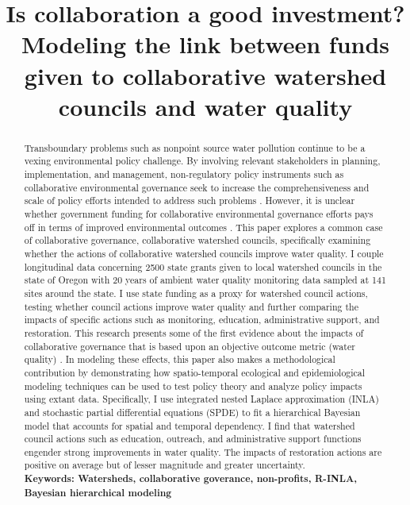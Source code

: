 \documentclass[12pt,a4paper,titlepage]{article}
\title{Is collaboration a good investment? Modeling the link between funds given to collaborative watershed councils and water quality}
\begin{document}
\maketitle

\begin{abstract}


Transboundary problems such as nonpoint source water pollution continue to be a vexing environmental policy challenge. By involving relevant stakeholders in planning, implementation, and management, non-regulatory policy instruments such as collaborative environmental governance seek to increase the comprehensiveness and scale of policy efforts intended to address such problems \parencite{margerum2011}. However, it is unclear whether government funding for collaborative environmental governance efforts pays off in terms of improved environmental outcomes \parencite{thomas2012}. This paper explores a common case of collaborative governance, collaborative watershed councils, specifically examining whether the actions of collaborative watershed councils improve water quality. I couple longitudinal data concerning 2500 state grants given to local watershed councils in the state of Oregon with 20 years of ambient water quality monitoring data sampled at 141 sites around the state. I use state funding as a proxy for watershed council actions, testing whether council actions improve water quality and further comparing the impacts of specific actions such as monitoring, education, administrative support, and restoration. This research presents some of the first evidence about the impacts of collaborative governance that is based upon an objective outcome metric (water quality) \parencite{carr2012,koontz2006}. In modeling these effects, this paper also makes a methodological contribution by demonstrating how spatio-temporal ecological and epidemiological modeling techniques can be used to test policy theory and analyze policy impacts using extant data. Specifically, I use integrated nested Laplace approximation (INLA) \parencite{rue2009} and stochastic partial differential equations (SPDE) \parencite{lindgren2011} to fit a hierarchical Bayesian model that accounts for spatial and temporal dependency. I find that watershed council actions such as education, outreach, and administrative support functions engender strong improvements in water quality. The impacts of restoration actions are positive on average but of lesser magnitude and greater uncertainty.\\

\noindent
\bf{Keywords}: Watersheds, collaborative goverance, non-profits, R-INLA, Bayesian hierarchical modeling
\end{abstract}
\end{document}

